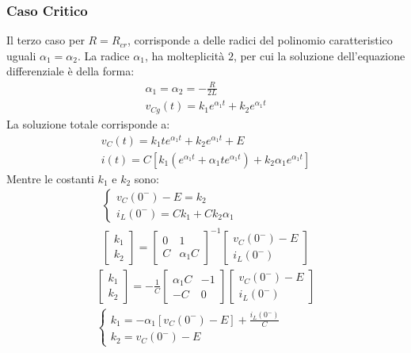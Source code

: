 \documentclass{article}
\numberwithin{equation}{subsection}
\begin{document}
\subsubsection{Caso Critico}
Il terzo caso per $R=R_{cr}$, corrisponde a delle radici del polinomio caratteristico uguali $\alpha_1=\alpha_2$. La radice $\alpha_1$, ha molteplicità $2$, per cui 
la soluzione dell'equazione differenziale è della forma:
\begin{gather*}
    \alpha_1=\alpha_2=\displaystyle-\frac{R}{2L}\\
    v_{Cg}(t)=k_1e^{\alpha_1t}+k_2e^{\alpha_1t}
\end{gather*}
La soluzione totale corrisponde a:
\begin{gather*}
    v_C(t)=k_1te^{\alpha_1t}+k_2e^{\alpha_1t}+E\\
    i(t)=C\left[k_1(e^{\alpha_1t}+\alpha_1te^{\alpha_1t})+k_2\alpha_1e^{\alpha_1t}\right]
\end{gather*}
Mentre le costanti $k_1$ e $k_2$ sono:
\begin{gather*}
    \begin{cases}
        v_C(0^-)-E=k_2\\
        i_L(0^-)=Ck_1+Ck_2\alpha_1
    \end{cases}\\
    \begin{bmatrix}
        k_1\\k_2
    \end{bmatrix}=\begin{bmatrix}
        0&1\\C&\alpha_1C
    \end{bmatrix}^{-1}\begin{bmatrix}
        v_C(0^-)-E\\i_L(0^-)
    \end{bmatrix}
\end{gather*}
\begin{gather*}
    \begin{bmatrix}
        k_1\\k_2
    \end{bmatrix}=\displaystyle-\frac{1}{C}\begin{bmatrix}
        \alpha_1C&-1\\-C&0
    \end{bmatrix}\begin{bmatrix}
        v_C(0^-)-E\\i_L(0^-)
    \end{bmatrix}\\
    \begin{cases}
        k_1=-\alpha_1[v_C(0^-)-E]+\displaystyle\frac{i_L(0^-)}{C}\\
        k_2=v_C(0^-)-E
    \end{cases}
\end{gather*}
\end{document}
